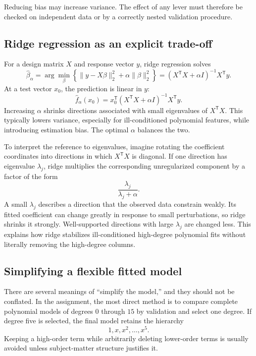 \documentclass[11pt,a4paper]{article}
\begin{document}
Reducing bias may increase variance. The effect of any lever must therefore be checked on independent data or by a correctly nested validation procedure.

\subsection{Ridge regression as an explicit trade-off}

For a design matrix $X$ and response vector $y$, ridge regression solves
\begin{equation}
  \widehat\beta_{\alpha}
  =\arg\min_{\beta}
   \left\{\|y-X\beta\|_2^2+\alpha\|\beta\|_2^2\right\}
  =(X^{\mathsf T}X+\alpha I)^{-1}X^{\mathsf T}y.
\end{equation}
At a test vector $x_0$, the prediction is linear in $y$:
\begin{equation}
  \widehat f_{\alpha}(x_0)
  =x_0^{\mathsf T}(X^{\mathsf T}X+\alpha I)^{-1}X^{\mathsf T}y.
\end{equation}
Increasing $\alpha$ shrinks directions associated with small eigenvalues of $X^{\mathsf T}X$. This typically lowers variance, especially for ill-conditioned polynomial features, while introducing estimation bias. The optimal $\alpha$ balances the two.

To interpret the reference to eigenvalues, imagine rotating the coefficient coordinates into directions in which $X^{\mathsf T}X$ is diagonal. If one direction has eigenvalue $\lambda_j$, ridge multiplies the corresponding unregularized component by a factor of the form
\begin{equation}
  \frac{\lambda_j}{\lambda_j+\alpha}.
\end{equation}
A small $\lambda_j$ describes a direction that the observed data constrain weakly. Its fitted coefficient can change greatly in response to small perturbations, so ridge shrinks it strongly. Well-supported directions with large $\lambda_j$ are changed less. This explains how ridge stabilizes ill-conditioned high-degree polynomial fits without literally removing the high-degree columns.

\subsection{Simplifying a flexible fitted model}

There are several meanings of ``simplify the model,'' and they should not be conflated. In the assignment, the most direct method is to compare complete polynomial models of degrees $0$ through $15$ by validation and select one degree. If degree five is selected, the final model retains the hierarchy
\begin{equation}
  1,x,x^2,\ldots,x^5.
\end{equation}
Keeping a high-order term while arbitrarily deleting lower-order terms is usually avoided unless subject-matter structure justifies it.
\end{document}
